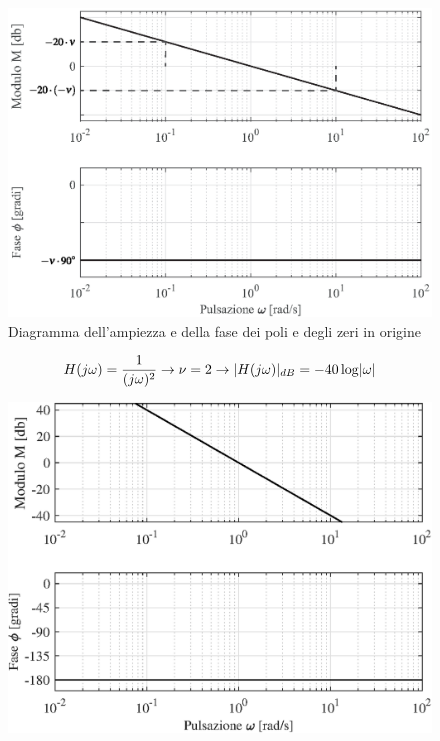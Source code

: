 \begin{figure}[H]
	\centering
	\includegraphics[width=0.8\linewidth]{immagini/cap6_Bode/bodeZPOrig.eps}
	\caption{ Diagramma dell'ampiezza e della fase dei poli e degli zeri in origine}
	\label{fig:bodeZPOrig}
\end{figure}

\begin{nexample}
	\[ H(j\omega) = \frac{1}{(j\omega)^2} \rightarrow \nu = 2 \rightarrow \lvert H(j\omega)\rvert_{dB} = -40 \log \lvert\omega\rvert\]
\begin{figure}[H]
	\centering
	\includegraphics[width=0.7\linewidth]{immagini/cap6_Bode/es1.eps}
	\label{fig:Bode_es1}
\end{figure}
\end{nexample}

